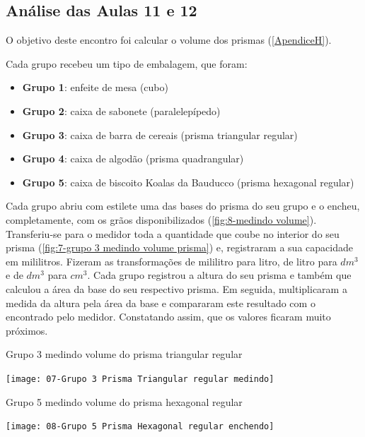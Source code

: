 \subsection{Análise das Aulas 11 e 12}

O objetivo deste encontro foi calcular o volume dos prismas (\autoref{ApendiceH}).

Cada grupo recebeu um tipo de embalagem, que foram:

\begin{itemize}
    \item \textbf{Grupo 1}: enfeite de mesa (cubo)
    \item \textbf{Grupo 2}: caixa de sabonete (paralelepípedo)
    \item \textbf{Grupo 3}: caixa de barra de cereais (prisma triangular regular)
    \item \textbf{Grupo 4}: caixa de algodão (prisma quadrangular)
    \item \textbf{Grupo 5}: caixa de biscoito Koalas da Bauducco (prisma hexagonal regular)
\end{itemize}

Cada grupo abriu com estilete uma das bases do prisma do seu grupo e o encheu, completamente, com os grãos disponibilizados (\autoref{fig:8-medindo volume}). Transferiu-se para o medidor toda a quantidade que coube no interior do seu prisma (\autoref{fig:7-grupo 3 medindo volume prisma}) e, registraram a sua capacidade em mililitros. Fizeram as transformações de mililitro para litro, de litro para $dm^3$ e de $dm^3$ para $cm^3$. Cada grupo registrou a altura do seu prisma e também que calculou a área da base do seu respectivo prisma. Em seguida, multiplicaram a medida da altura pela área da base e compararam este resultado com o encontrado pelo medidor. Constatando assim, que os valores ficaram muito próximos.

\begin{CenteredFigure}
    \caption{Grupo 3 medindo volume do prisma triangular regular} \label{fig:7-grupo 3 medindo volume prisma}
    \texttt{[image: 07-Grupo 3 Prisma Triangular regular medindo]}
    \legend{\autoria}
\end{CenteredFigure}

\begin{CenteredFigure}
    \caption{Grupo 5 medindo volume do prisma hexagonal regular} \label{fig:8-medindo volume}
    \texttt{[image: 08-Grupo 5 Prisma Hexagonal regular enchendo]}
    \legend{\autoria}
\end{CenteredFigure}

